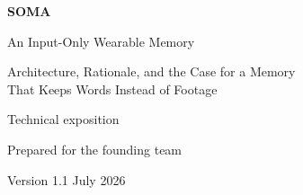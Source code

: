 \documentclass[12pt,openany]{report}
\begin{document}
\begin{titlepage}\centering\vspace*{5.4cm}
{\Huge\bfseries SOMA\par}\vspace{9mm}
{\LARGE An Input-Only Wearable Memory\par}\vspace{14mm}
{\large Architecture, Rationale, and the Case for a Memory\\That Keeps Words Instead of Footage\par}
\vfill
{\large Technical exposition\par}\vspace{2mm}
{Prepared for the founding team\par}\vspace{9mm}
{Version 1.1 \quad\textperiodcentered\quad July 2026\par}
\vspace{16mm}\end{titlepage}
\tableofcontents
\cleardoublepage
{}

\end{document}

